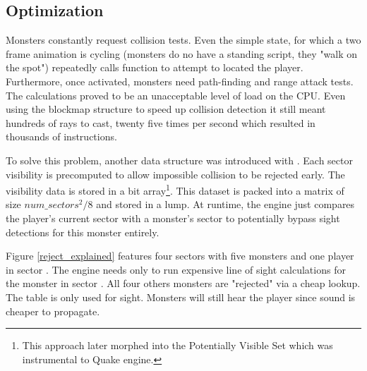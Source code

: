 \subsection{Optimization}
Monsters constantly request collision tests. Even the simple  state, for which a two frame animation is cycling (monsters do no have a standing script, they "walk on the spot") repeatedly calls  function to attempt to located the player. Furthermore, once activated, monsters need path-finding and range attack tests. The calculations proved to be an unacceptable level of load on the CPU. Even using the blockmap structure to speed up collision detection it still meant hundreds of rays to cast, twenty five times per second which resulted in thousands of instructions.\\
\par
To solve this problem, another data structure was introduced with . Each sector visibility is precomputed to allow impossible collision to be rejected early. The visibility data is stored in a bit array\footnote{This approach later morphed into the Potentially Visible Set which was instrumental to Quake engine.}. This dataset is packed into a matrix of size $num\_sectors^2/8$ and stored in a  lump. At runtime, the engine just compares the player's current sector with a monster's sector to potentially bypass sight detections for this monster entirely.\\
\par
{}
\vspace{-7pt}
Figure \ref{reject_explained} features four sectors with five monsters and one player in sector . The engine needs only to run expensive line of sight calculations for the monster in sector . All four others monsters are "rejected" via a cheap lookup. The table is only used for sight. Monsters will still hear the player since sound is cheaper to propagate.\\
\par
{}






